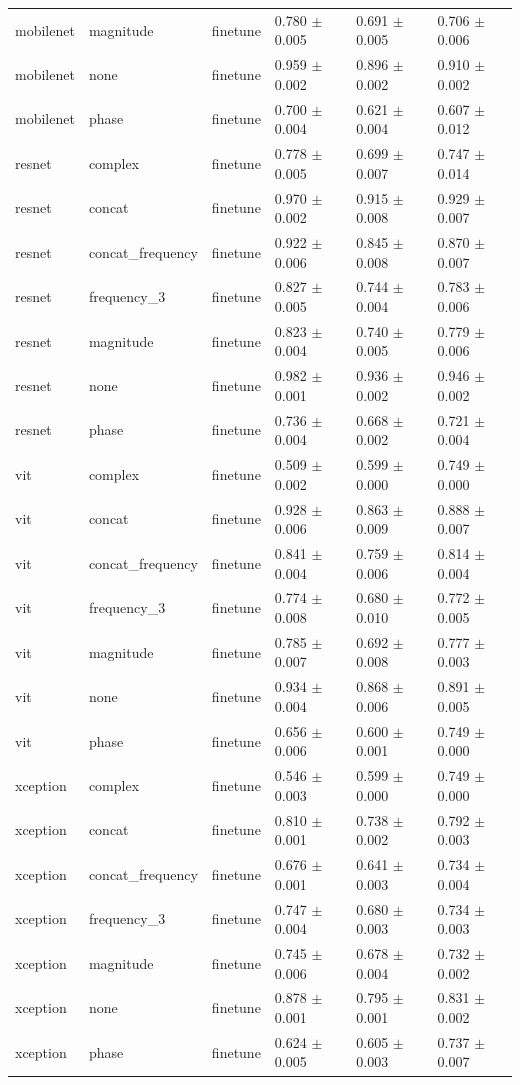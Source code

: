\begin{table}
\begin{tabular}{llllll}
mobilenet & magnitude & finetune & 0.780 $\pm$ 0.005 & 0.691 $\pm$ 0.005 & 0.706 $\pm$ 0.006 \\
mobilenet & none & finetune & 0.959 $\pm$ 0.002 & 0.896 $\pm$ 0.002 & 0.910 $\pm$ 0.002 \\
mobilenet & phase & finetune & 0.700 $\pm$ 0.004 & 0.621 $\pm$ 0.004 & 0.607 $\pm$ 0.012 \\
resnet & complex & finetune & 0.778 $\pm$ 0.005 & 0.699 $\pm$ 0.007 & 0.747 $\pm$ 0.014 \\
resnet & concat & finetune & 0.970 $\pm$ 0.002 & 0.915 $\pm$ 0.008 & 0.929 $\pm$ 0.007 \\
resnet & concat_frequency & finetune & 0.922 $\pm$ 0.006 & 0.845 $\pm$ 0.008 & 0.870 $\pm$ 0.007 \\
resnet & frequency_3 & finetune & 0.827 $\pm$ 0.005 & 0.744 $\pm$ 0.004 & 0.783 $\pm$ 0.006 \\
resnet & magnitude & finetune & 0.823 $\pm$ 0.004 & 0.740 $\pm$ 0.005 & 0.779 $\pm$ 0.006 \\
resnet & none & finetune & 0.982 $\pm$ 0.001 & 0.936 $\pm$ 0.002 & 0.946 $\pm$ 0.002 \\
resnet & phase & finetune & 0.736 $\pm$ 0.004 & 0.668 $\pm$ 0.002 & 0.721 $\pm$ 0.004 \\
vit & complex & finetune & 0.509 $\pm$ 0.002 & 0.599 $\pm$ 0.000 & 0.749 $\pm$ 0.000 \\
vit & concat & finetune & 0.928 $\pm$ 0.006 & 0.863 $\pm$ 0.009 & 0.888 $\pm$ 0.007 \\
vit & concat_frequency & finetune & 0.841 $\pm$ 0.004 & 0.759 $\pm$ 0.006 & 0.814 $\pm$ 0.004 \\
vit & frequency_3 & finetune & 0.774 $\pm$ 0.008 & 0.680 $\pm$ 0.010 & 0.772 $\pm$ 0.005 \\
vit & magnitude & finetune & 0.785 $\pm$ 0.007 & 0.692 $\pm$ 0.008 & 0.777 $\pm$ 0.003 \\
vit & none & finetune & 0.934 $\pm$ 0.004 & 0.868 $\pm$ 0.006 & 0.891 $\pm$ 0.005 \\
vit & phase & finetune & 0.656 $\pm$ 0.006 & 0.600 $\pm$ 0.001 & 0.749 $\pm$ 0.000 \\
xception & complex & finetune & 0.546 $\pm$ 0.003 & 0.599 $\pm$ 0.000 & 0.749 $\pm$ 0.000 \\
xception & concat & finetune & 0.810 $\pm$ 0.001 & 0.738 $\pm$ 0.002 & 0.792 $\pm$ 0.003 \\
xception & concat_frequency & finetune & 0.676 $\pm$ 0.001 & 0.641 $\pm$ 0.003 & 0.734 $\pm$ 0.004 \\
xception & frequency_3 & finetune & 0.747 $\pm$ 0.004 & 0.680 $\pm$ 0.003 & 0.734 $\pm$ 0.003 \\
xception & magnitude & finetune & 0.745 $\pm$ 0.006 & 0.678 $\pm$ 0.004 & 0.732 $\pm$ 0.002 \\
xception & none & finetune & 0.878 $\pm$ 0.001 & 0.795 $\pm$ 0.001 & 0.831 $\pm$ 0.002 \\
xception & phase & finetune & 0.624 $\pm$ 0.005 & 0.605 $\pm$ 0.003 & 0.737 $\pm$ 0.007 \\
\bottomrule
\end{tabular}
\end{table}


